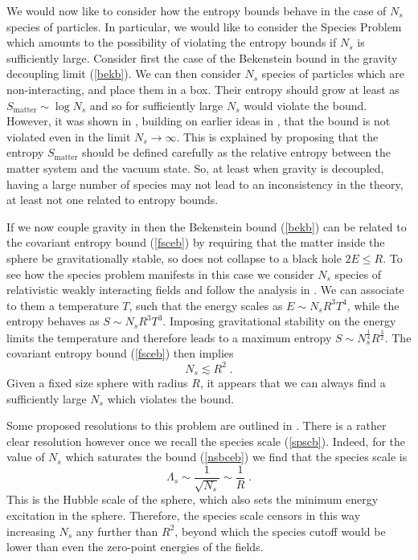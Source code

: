 \documentclass[11pt,a4paper]{article}
\numberwithin{equation}{section}
\numberwithin{table}{section}\setlength{\multlinegap}{25pt}
\newcommand{\be}{\begin{equation}}
\newcommand{\ee}{\end{equation}}
\begin{document}
We would now like to consider how the entropy bounds behave in the case of $N_s$ species of particles. In particular, we would like to consider the Species Problem \cite{PhysRevD.34.373,Bekenstein:1993dz,Jacobson:1994iw,Bekenstein:2000sw,Veneziano:2001ah,Bousso:2002ju} which amounts to the possibility of violating the entropy bounds if $N_s$ is sufficiently large. Consider first the case of the Bekenstein bound in the gravity decoupling limit (\ref{bekb}). We can then consider $N_s$ species of particles which are non-interacting, and place them in a box. Their entropy should grow at least as $S_{\mathrm{matter}} \sim \log N_s$ and so for sufficiently large $N_s$ would violate the bound. However, it was shown in \cite{Casini:2008cr}, building on earlier ideas in \cite{Marolf:2003sq,Marolf:2004et}, that the bound is not violated even in the limit $N_s \rightarrow \infty$. This is explained by proposing that the entropy $S_{\mathrm{matter}}$ should be defined carefully as the relative entropy between the matter system and the vacuum state. So, at least when gravity is decoupled, having a large number of species may not lead to an inconsistency in the theory, at least not one related to entropy bounds.

If we now couple gravity in then the Bekenstein bound (\ref{bekb}) can be related to the covariant entropy bound (\ref{fsceb}) by requiring that the matter inside the sphere be gravitationally stable, so does not collapse to a black hole $2E \leq R$. To see how the species problem manifests in this case we consider $N_s$ species of relativistic weakly interacting fields and follow the analysis in \cite{Page:1982fj,Cohen:1998zx,Bousso:2002ju,Banks:2005bm,Ooguri:2018wrx}. We can associate to them a temperature $T$, such that the energy scales as $E \sim N_s R^3 T^4$, while the entropy behaves as $S \sim N_s R^3 T^3$. Imposing gravitational stability on the energy limits the temperature and therefore leads to a maximum entropy $S \sim N_s^{\frac14} R^{\frac32}$. The covariant entropy bound (\ref{fsceb}) then implies 
\be
\label{nsbceb}
N_s \lesssim R^2 \;.
\ee
Given a fixed size sphere with radius $R$, it appears that we can always find a sufficiently large $N_s$ which violates the bound. 

Some proposed resolutions to this problem are outlined in \cite{Bousso:2002ju}. There is a rather clear resolution however once we recall the species scale (\ref{spscb}). Indeed, for the value of $N_s$ which saturates the bound (\ref{nsbceb}) we find that the species scale is 
\be
\Lambda_s \sim \frac{1}{\sqrt{N_s}} \sim \frac{1}{R} \;.
\label{spceb}
\ee
This is the Hubble scale of the sphere, which also sets the minimum energy excitation in the sphere. Therefore, the species scale censors in this way increasing $N_s$ any further than $R^2$, beyond which the species cutoff would be lower than even the zero-point energies of the fields.
\end{document}
